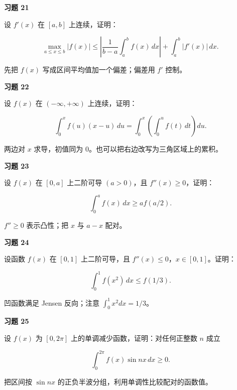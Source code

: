 \begin{exercisebox}
\textbf{习题 21 }

设 \(f'(x)\) 在 \([a,b]\) 上连续，证明：

\[
      \max_{a\le x\le b}|f(x)|
      \le
      \left|\frac1{b-a}\int_a^b f(x)\,dx\right|
      +\int_a^b|f'(x)|\,dx.
      \]

\begin{hintbox}
先把 \(f(x)\) 写成区间平均值加一个偏差；偏差用 \(f'\) 控制。
\end{hintbox}
\end{exercisebox}

\begin{exercisebox}
\textbf{习题 22 }

设 \(f(x)\) 在 \((-\infty,+\infty)\) 上连续，证明：

\[
      \int_0^x f(u)(x-u)\,du
      =
      \int_0^x\left(\int_0^u f(t)\,dt\right)du.
      \]

\begin{hintbox}
两边对 \(x\) 求导，初值同为 \(0\)。也可以把右边改写为三角区域上的累积。
\end{hintbox}
\end{exercisebox}

\begin{exercisebox}
\textbf{习题 23 }

设 \(f(x)\) 在 \([0,a]\) 上二阶可导 \((a>0)\)，且 \(f''(x)\ge0\)，证明：

\[
      \int_0^a f(x)\,dx\ge af(a/2).
      \]

\begin{hintbox}
\(f''\ge0\) 表示凸性；把 \(x\) 与 \(a-x\) 配对。
\end{hintbox}
\end{exercisebox}

\begin{exercisebox}
\textbf{习题 24 }

设函数 \(f(x)\) 在 \([0,1]\) 上二阶可导，且 \(f''(x)\le0\)，\(x\in[0,1]\)。证明：

\[
      \int_0^1 f(x^2)\,dx\le f(1/3).
      \]

\begin{hintbox}
凹函数满足 Jensen 反向；注意 \(\int_0^1x^2dx=1/3\)。
\end{hintbox}
\end{exercisebox}

\begin{exercisebox}
\textbf{习题 25 }

设 \(f(x)\) 为 \([0,2\pi]\) 上的单调减少函数，证明：对任何正整数 \(n\) 成立

\[
      \int_0^{2\pi} f(x)\sin nx\,dx\ge0.
      \]

\begin{hintbox}
把区间按 \(\sin nx\) 的正负半波分组，利用单调性比较配对的函数值。
\end{hintbox}
\end{exercisebox}

